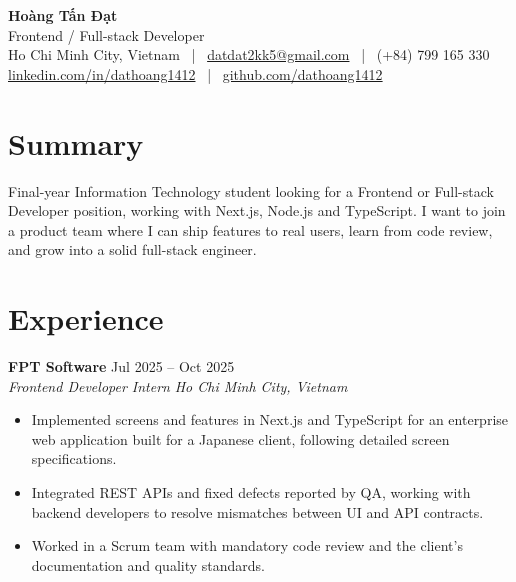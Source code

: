 \documentclass[a4paper,10pt]{article}
\newcommand{\entry}[4]{%
    \noindent\textbf{#1} \hfill #2 \\
    \noindent\textit{#3} \hfill \textit{#4}\par
}
\begin{document}
\begin{center}
    {\Huge \textbf{Hoàng Tấn Đạt}} \\[4pt]
    {\large Frontend / Full-stack Developer} \\[4pt]
    Ho Chi Minh City, Vietnam \ | \
    \href{mailto:datdat2kk5@gmail.com}{datdat2kk5@gmail.com} \ | \
    (+84) 799 165 330 \\[2pt]
    \href{https://linkedin.com/in/dathoang1412}{linkedin.com/in/dathoang1412} \ | \
    \href{https://github.com/dathoang1412}{github.com/dathoang1412}
\end{center}

\section{Summary}
Final-year Information Technology student looking for a Frontend or Full-stack Developer position, working with Next.js, Node.js and TypeScript.
I want to join a product team where I can ship features to real users, learn from code review, and grow into a solid full-stack engineer.

\section{Experience}

\entry{FPT Software}{Jul 2025 -- Oct 2025}
      {Frontend Developer Intern}{Ho Chi Minh City, Vietnam}
\begin{itemize}
    \item Implemented screens and features in Next.js and TypeScript for an enterprise web application built for a Japanese client, following detailed screen specifications.
    \item Integrated REST APIs and fixed defects reported by QA, working with backend developers to resolve mismatches between UI and API contracts.
    \item Worked in a Scrum team with mandatory code review and the client's documentation and quality standards.
\end{itemize}
\end{document}
